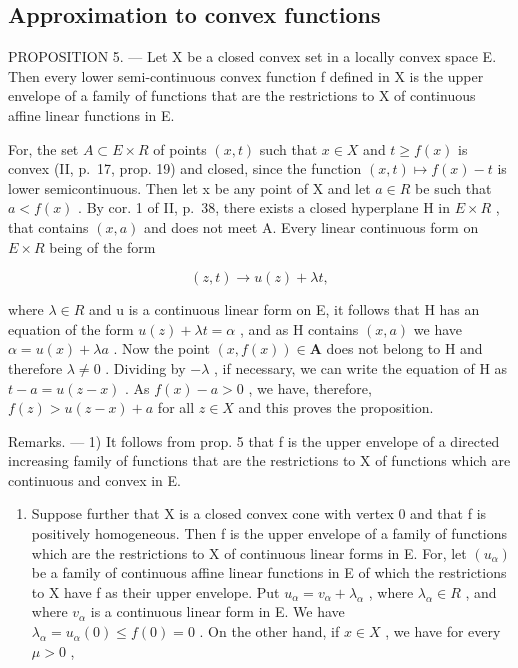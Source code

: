 \subsection{Approximation to convex functions}

PROPOSITION 5. --- Let X be a closed convex set in a locally convex space E. Then every lower semi-continuous convex function f defined in X is the upper envelope of a family of functions that are the restrictions to X of continuous affine linear functions in E.

For, the set \(A \subset E \times R\) of points \((x, t)\) such that \(x \in X\) and \(t \geqslant f(x)\) is convex (II, p.~17, prop. 19) and closed, since the function \((x, t) \mapsto f(x) - t\) is lower semicontinuous. Then let x be any point of X and let \(a \in R\) be such that \(a < f(x)\) . By cor. 1 of II, p.~38, there exists a closed hyperplane H in \(E \times R\) , that contains \((x, a)\) and does not meet A. Every linear continuous form on \(E \times R\) being of the form

\[
(z, t) \rightarrow u (z) + \lambda t,
\]

where \(\lambda\in R\) and u is a continuous linear form on E, it follows that H has an equation of the form \(u(z)+\lambda t=\alpha\) , and as H contains \((x,a)\) we have \(\alpha=u(x)+\lambda a\) . Now the point \((x,f(x))\in\mathbf{A}\) does not belong to H and therefore \(\lambda\neq0\) . Dividing by \(-\lambda\) , if necessary, we can write the equation of H as \(t-a=u(z-x)\) . As \(f(x)-a>0\) , we have, therefore, \(f(z)>u(z-x)+a\) for all \(z\in X\) and this proves the proposition.

Remarks. --- 1) It follows from prop. 5 that f is the upper envelope of a directed increasing family of functions that are the restrictions to X of functions which are continuous and convex in E.

\begin{enumerate}
\def\labelenumi{\arabic{enumi})}
\setcounter{enumi}{1}
\tightlist
\item
  Suppose further that X is a closed convex cone with vertex 0 and that f is positively homogeneous. Then f is the upper envelope of a family of functions which are the restrictions to X of continuous linear forms in E. For, let \((u_{\alpha})\) be a family of continuous affine linear functions in E of which the restrictions to X have f as their upper envelope. Put \(u_{\alpha} = v_{\alpha} + \lambda_{\alpha}\) , where \(\lambda_{\alpha} \in R\) , and where \(v_{\alpha}\) is a continuous linear form in E. We have \(\lambda_{\alpha} = u_{\alpha}(0) \leqslant f(0) = 0\) . On the other hand, if \(x \in X\) , we have for every \(\mu > 0\) ,
\end{enumerate}


